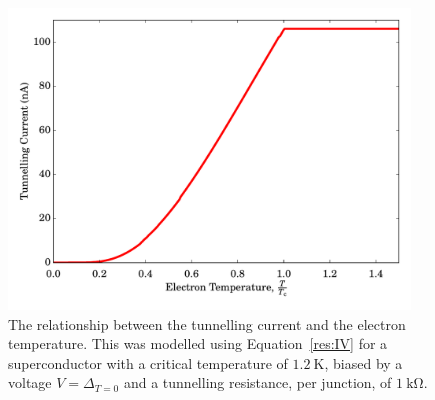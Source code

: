 \begin{figure}[t]
\begin{center}
\includegraphics[width = 0.95\textwidth]{figures/IvsTe_model}
\caption[Dependance of tunnelling current on electron temperature]{The relationship between the tunnelling current and the electron temperature. This was modelled using Equation~\ref{res:IV} for a superconductor with a critical temperature of $1.2~\mathrm{K}$, biased by a voltage $V = \varDelta_{T=0}$ and a tunnelling resistance, per junction, of $1~\mathrm{k\Omega}$.}
\label{fig:IvsTe_model}
\end{center}
\end{figure}
%
